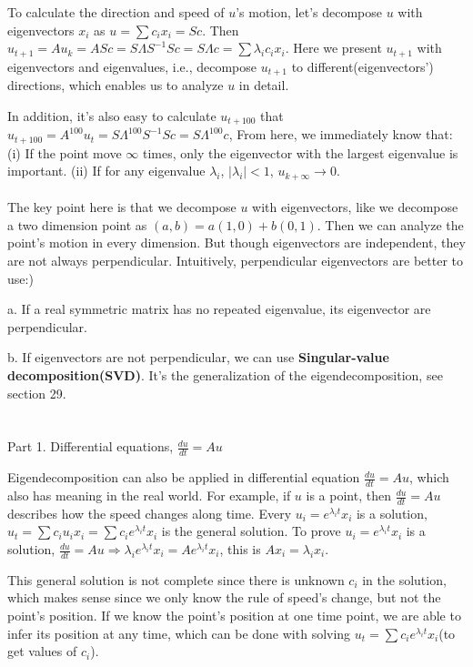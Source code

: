 \documentclass{article}
\begin{document}
\begin{spacing}{1.5}
To calculate the direction and speed of $u$'s motion, let's decompose $u$ with eigenvectors $x_i$ as $u=\sum c_ix_i=Sc$. Then $u_{t+1}=Au_k=ASc=S\Lambda S^{-1}Sc=S\Lambda c=\sum \lambda_i c_i x_i$. Here we present $u_{t+1}$ with eigenvectors and eigenvalues, i.e., decompose $u_{t+1}$ to different(eigenvectors') directions, which enables us to analyze $u$ in detail.

In addition, it's also easy to calculate $u_{t+100}$ that $u_{t+100}=A^{100}u_t=S\Lambda^{100} S^{-1}Sc=S\Lambda^{100}c$, From here, we immediately know that: (i) If the point move $\infty$ times, only the eigenvector with the largest eigenvalue is important. (ii) If for any eigenvalue $\lambda_i$, $|\lambda_i|<1$, $u_{k+\infty}\rightarrow 0$.
\\\\\hspace*{0.5cm}The key point here is that we decompose $u$ with eigenvectors, like we decompose a two dimension point as $(a, b) = a(1, 0) + b(0, 1)$. Then we can analyze the point's motion in every dimension. But though eigenvectors are independent, they are not always perpendicular. Intuitively, perpendicular eigenvectors are better to use:)

a. If a real symmetric matrix has no repeated eigenvalue, its eigenvector are perpendicular.

b. If eigenvectors are not perpendicular, we can use {\bfseries Singular-value decomposition(SVD)}. It's the generalization of the eigendecomposition, see section 29.


\section{}
Part 1. Differential equations, $\frac{du}{dt}=Au$

Eigendecomposition can also be applied in differential equation $\frac{du}{dt}=Au$, which also has meaning in the real world. For example, if $u$ is a point, then $\frac{du}{dt}=Au$ describes how the speed changes along time. Every $u_i=e^{\lambda_i t}x_i$ is a solution, $u_t=\sum c_i u_i x_i = \sum c_i e^{\lambda_i t} x_i$ is the general solution. To prove $u_i=e^{\lambda_i t}x_i$ is a solution, $\frac{du}{dt}=Au \Rightarrow \lambda_ie^{\lambda_i t} x_i=Ae^{\lambda_i t}x_i$, this is $Ax_i=\lambda_i x_i$.

This general solution is not complete since there is unknown $c_i$ in the solution, which makes sense since we only know the rule of speed's change, but not the point's position. If we know the point's position at one time point, we are able to infer its position at any time, which can be done with solving $u_t=\sum c_i e^{\lambda_i t} x_i$(to get values of $c_i$).


\end{spacing}
\end{document}
